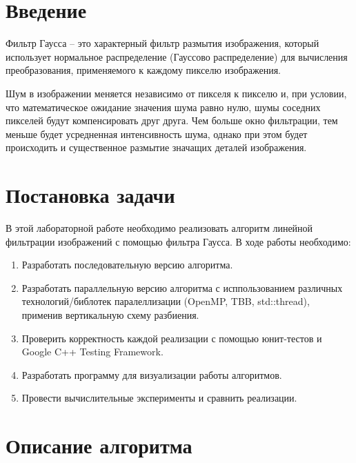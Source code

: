 \documentclass{report}
\begin{document}
\setcounter{page}{2}

\tableofcontents
\newpage

\section*{Введение}

Фильтр Гаусса -- это характерный фильтр размытия изображения, который использует нормальное распределение (Гауссово распределение) для вычисления преобразования, применяемого к каждому пикселю изображения.

Шум в изображении меняется независимо от пикселя к пикселю и, при условии, что математическое ожидание значения шума равно нулю, шумы соседних пикселей будут компенсировать друг друга. Чем больше окно фильтрации, тем меньше будет усредненная интенсивность шума, однако при этом будет происходить и существенное размытие значащих деталей изображения.

\newpage

\section*{Постановка задачи}

В этой лабораторной работе необходимо реализовать алгоритм линейной фильтрации изображений с помощью фильтра Гаусса. В ходе работы необходимо:

\begin{enumerate}
    \item Разработать последовательную версию алгоритма.
    \item Разработать параллельную версию алгоритма с исппользованием различных технологий/библотек паралеллизации (OpenMP, TBB, std::thread), применив вертикальную схему разбиения.
    \item Проверить корректность каждой реализации с помощью юнит-тестов и Google C++ Testing Framework.
    \item Разработать программу для визуализации работы алгоритмов.
    \item Провести вычислительные эксперименты и сравнить реализации.
\end{enumerate}
\newpage

\section*{Описание алгоритма}
\end{document}
